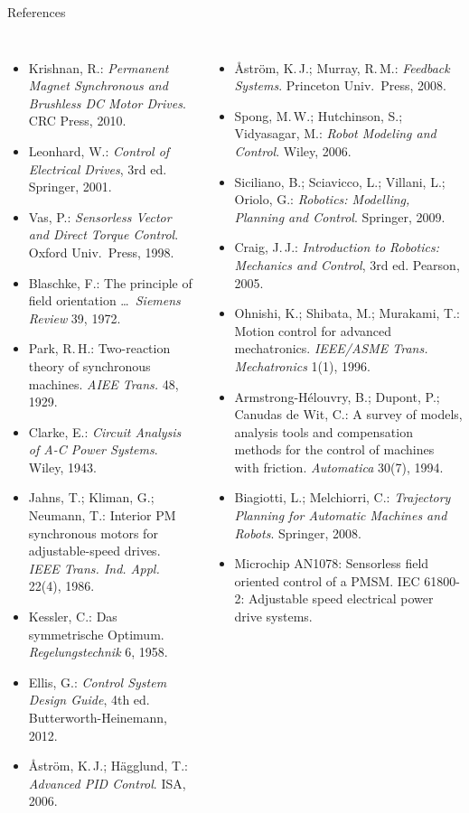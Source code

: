 \documentclass[aspectratio=169,10pt]{beamer}
\begin{document}
\begin{frame}[t]{References}
\fontsize{6}{7}\selectfont\setlength{\itemsep}{0pt}
\begin{columns}[T,onlytextwidth]
\begin{itemize}
\item Krishnan, R.: \emph{Permanent Magnet Synchronous and Brushless DC Motor Drives}. CRC Press, 2010.
\item Leonhard, W.: \emph{Control of Electrical Drives}, 3rd ed. Springer, 2001.
\item Vas, P.: \emph{Sensorless Vector and Direct Torque Control}. Oxford Univ.\ Press, 1998.
\item Blaschke, F.: The principle of field orientation \ldots\ \emph{Siemens Review} 39, 1972.
\item Park, R.\,H.: Two-reaction theory of synchronous machines. \emph{AIEE Trans.} 48, 1929.
\item Clarke, E.: \emph{Circuit Analysis of A-C Power Systems}. Wiley, 1943.
\item Jahns, T.; Kliman, G.; Neumann, T.: Interior PM synchronous motors for adjustable-speed drives. \emph{IEEE Trans. Ind. Appl.} 22(4), 1986.
\item Kessler, C.: Das symmetrische Optimum. \emph{Regelungstechnik} 6, 1958.
\item Ellis, G.: \emph{Control System Design Guide}, 4th ed. Butterworth-Heinemann, 2012.
\item Åström, K.\,J.; Hägglund, T.: \emph{Advanced PID Control}. ISA, 2006.
\end{itemize}
\begin{itemize}
\item Åström, K.\,J.; Murray, R.\,M.: \emph{Feedback Systems}. Princeton Univ.\ Press, 2008.
\item Spong, M.\,W.; Hutchinson, S.; Vidyasagar, M.: \emph{Robot Modeling and Control}. Wiley, 2006.
\item Siciliano, B.; Sciavicco, L.; Villani, L.; Oriolo, G.: \emph{Robotics: Modelling, Planning and Control}. Springer, 2009.
\item Craig, J.\,J.: \emph{Introduction to Robotics: Mechanics and Control}, 3rd ed. Pearson, 2005.
\item Ohnishi, K.; Shibata, M.; Murakami, T.: Motion control for advanced mechatronics. \emph{IEEE/ASME Trans. Mechatronics} 1(1), 1996.
\item Armstrong-Hélouvry, B.; Dupont, P.; Canudas de Wit, C.: A survey of models, analysis tools and compensation methods for the control of machines with friction. \emph{Automatica} 30(7), 1994.
\item Biagiotti, L.; Melchiorri, C.: \emph{Trajectory Planning for Automatic Machines and Robots}. Springer, 2008.
\item Microchip AN1078: Sensorless field oriented control of a PMSM. \quad IEC 61800-2: Adjustable speed electrical power drive systems.
\end{itemize}
\end{columns}
\end{frame}
\end{document}

